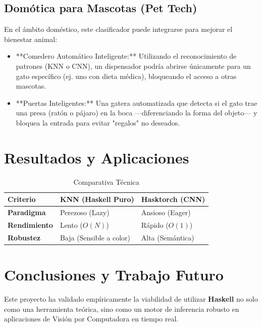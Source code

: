 \documentclass[12pt, letterpaper]{article}
\begin{document}
\subsection{Domótica para Mascotas (Pet Tech)}
En el ámbito doméstico, este clasificador puede integrarse para mejorar el bienestar animal:
\begin{itemize}
    \item **Comedero Automático Inteligente:** Utilizando el reconocimiento de patrones (KNN o CNN), un dispensador podría abrirse únicamente para un gato específico (ej. uno con dieta médica), bloqueando el acceso a otras mascotas.
    \item **Puertas Inteligentes:** Una gatera automatizada que detecta si el gato trae una presa (ratón o pájaro) en la boca —diferenciando la forma del objeto— y bloquea la entrada para evitar "regalos" no deseados.
\end{itemize}

\section{Resultados y Aplicaciones}

\begin{table}[H]
\centering
\begin{tabular}{@{}lll@{}}
\toprule
\textbf{Criterio} & \textbf{KNN (Haskell Puro)} & \textbf{Hasktorch (CNN)} \\ \midrule
\textbf{Paradigma} & Perezoso (Lazy) & Ansioso (Eager) \\
\textbf{Rendimiento} & Lento ($O(N)$) & Rápido ($O(1)$) \\
\textbf{Robustez} & Baja (Sensible a color) & Alta (Semántica) \\ \bottomrule
\end{tabular}
\caption{Comparativa Técnica}
\end{table}

\section{Conclusiones y Trabajo Futuro}

Este proyecto ha validado empíricamente la viabilidad de utilizar \textbf{Haskell} no solo como una herramienta teórica, sino como un motor de inferencia robusto en aplicaciones de Visión por Computadora en tiempo real.
\end{document}
